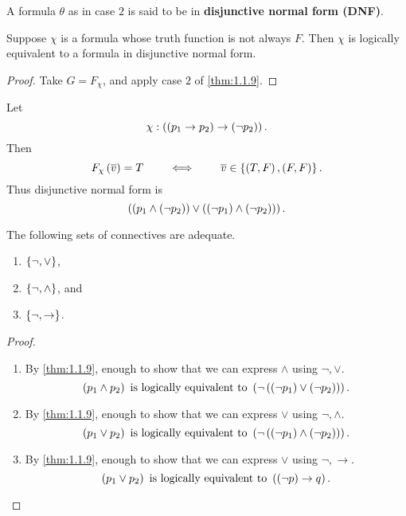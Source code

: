 A formula $ \theta $ as in case $ 2 $ is said to be in \textbf{disjunctive normal form (DNF)}.

\begin{corollary}
Suppose $ \chi $ is a formula whose truth function is not always $ F $. Then $ \chi $ is logically equivalent to a formula in disjunctive normal form.
\end{corollary}

\begin{proof}
Take $ G = F_\chi $, and apply case $ 2 $ of \ref{thm:1.1.9}.
\end{proof}

\begin{example2}
Let
$$ \chi : \left( \left( p_1 \rightarrow p_2 \right) \rightarrow \left( \neg p_2 \right) \right). $$
Then
$$ F_\chi\left( \overline{v} \right) = T \qquad \iff \qquad \overline{v} \in \left\{ \left( T, F \right), \left( F, F \right) \right\}. $$
Thus disjunctive normal form is
$$ \left( \left( p_1 \land \left( \neg p_2 \right) \right) \lor \left( \left( \neg p_1 \right) \land \left( \neg p_2 \right) \right) \right). $$
\end{example2}

\pagebreak

\begin{corollary}
The following sets of connectives are adequate.
\begin{enumerate}
\item $ \left\{ \neg, \lor \right\} $,
\item $ \left\{ \neg, \land \right\} $, and
\item $ \left\{ \neg, \rightarrow \right\} $.
\end{enumerate}
\end{corollary}

\begin{proof}
\hfill
\begin{enumerate}
\item By \ref{thm:1.1.9}, enough to show that we can express $ \land $ using $ \neg, \lor $.
$$ \left( p_1 \land p_2 \right) \ \text{is logically equivalent to} \ \left( \neg \left( \left( \neg p_1 \right) \lor \left( \neg p_2 \right) \right) \right). $$
\item By \ref{thm:1.1.9}, enough to show that we can express $ \lor $ using $ \neg, \land $.
$$ \left( p_1 \lor p_2 \right) \ \text{is logically equivalent to} \ \left( \neg \left( \left( \neg p_1 \right) \land \left( \neg p_2 \right) \right) \right). $$
\item By \ref{thm:1.1.9}, enough to show that we can express $ \lor $ using $ \neg, \rightarrow $.
$$ \left( p_1 \lor p_2 \right) \ \text{is logically equivalent to} \ \left( \left( \neg p \right) \rightarrow q \right). $$
\end{enumerate}
\end{proof}


